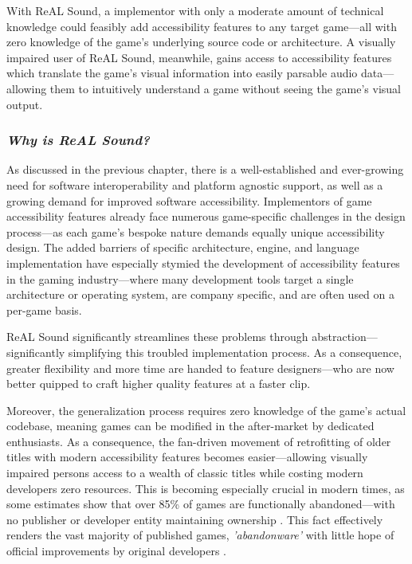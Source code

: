 \documentclass{report}
\newcommand{\rs}{ReAL Sound\xspace}
\begin{document}
With \rs, a implementor with only a moderate amount of technical knowledge  could feasibly add accessibility features to any target game---all with zero knowledge of the game's underlying source code or architecture. A visually impaired user of \rs, meanwhile, gains access to accessibility features which translate the game's visual information into easily parsable audio data---allowing them to intuitively understand a game without seeing the game's visual output. 


\subsubsection{\emph{Why is \rs?}}
As discussed in the previous chapter, there is a well-established and ever-growing need for software interoperability and platform agnostic support, as well as a growing demand for improved software accessibility. Implementors of game accessibility features already face numerous game-specific challenges in the design process---as each game's bespoke nature demands equally unique accessibility design. The added barriers of specific architecture, engine, and language implementation have especially stymied the development of accessibility features in the gaming industry---where many development tools target a single architecture or operating system, are company specific, and are often used on a per-game basis. 

\rs significantly streamlines these problems through abstraction---significantly simplifying this troubled implementation process. As a consequence, greater flexibility and more time are handed to feature designers---who are now better quipped to craft higher quality features at a faster clip.

Moreover, the generalization process requires zero knowledge of the game's actual codebase, meaning games can be modified in the after-market by dedicated enthusiasts. As a consequence, the fan-driven movement of retrofitting of older titles with modern accessibility features becomes easier---allowing visually impaired persons access to a wealth of classic titles while costing modern developers zero resources. This is becoming especially crucial in modern times, as some estimates show that over 85\% of games are functionally abandoned---with no publisher or developer entity maintaining ownership \cite{Lewin_2023}. This fact effectively renders the vast majority of published games, \emph{'abandonware'} with little hope of official improvements by original developers \cite{Costikyan_2000}.
\end{document}
